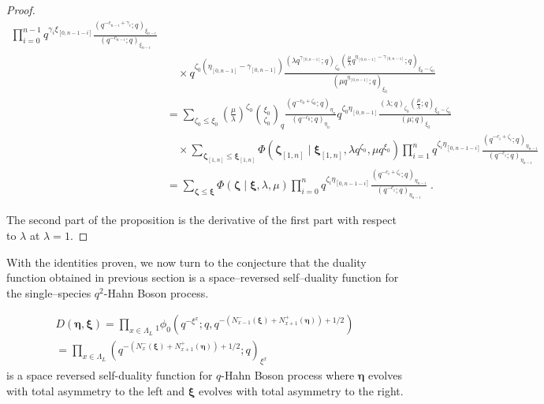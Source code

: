 \documentclass{ximera}
\begin{document}
\begin{proof}
\begin{align*}
        \prod_{i=0}^{n-1}q^{\gamma_i\xi_{[0,n-1-i]}}\frac{\left(q^{-c_{n-i}+\gamma_{i}};q\right)_{\xi_{n-i}}}{\left(q^{-c_{n-i}};q\right)_{\xi_{n-i}}} \\    
        &  \quad  \times q^{\zeta_0(\eta_{[0,n-1]}-\gamma_{[0,n-1]})}\frac{(\lambda q^{\gamma_{[0,n-1]}};q)_{\zeta_0}(\frac{\mu}{\lambda} q^{\eta_{[0,n-1]}-\gamma_{[0,n-1]}};q)_{\xi_{0}-\zeta_0}}{(\mu q^{\eta_{[0,n-1]}};q)_{\xi_{0}}}\\
        &=\sum_{\zeta_0\le \xi_{0}}\left(\frac{\mu}{\lambda}\right)^{\zeta_0}\binom{\xi_{0}}{\zeta_0}_q\frac{\left(q^{-c_{0}+\zeta_0};q\right)_{\eta_n}}{\left(q^{-c_{0}};q\right)_{\eta_n}}q^{\zeta_0\eta_{[0,n-1]}}\frac{(\lambda;q)_{\zeta_0}(\frac{\mu}{\lambda};q)_{\xi_0-\zeta_0}}{(\mu;q)_{\xi_0}}\\
     & \quad \times\sum_{\boldsymbol\zeta_{[1,n]}\le \boldsymbol\xi_{[1,n]}}\Phi(\boldsymbol\zeta_{[1,n]}\mid\boldsymbol\xi_{[1,n]},\lambda q^{\zeta_0},\mu q^{\xi_0})\prod_{i=1}^{n}q^{\zeta_i\eta_{[0,n-1-i]}}\frac{\left(q^{-c_{i}+\zeta_{i}};q\right)_{\eta_{n-i}}}{\left(q^{-c_{i}};q\right)_{\eta_{n-i}}}\\
      &   =\sum_{\boldsymbol\zeta\le \boldsymbol\xi }\Phi(\boldsymbol\zeta\mid\boldsymbol\xi,\lambda,\mu)\prod_{i=0}^{n}q^{\zeta_i\eta_{[0,n-1-i]}}\frac{\left(q^{-c_i+\zeta_i};q\right)_{\eta_{n-i}}}{\left(q^{-c_i};q\right)_{\eta_{n-i}}}\;.
         \end{align*}
  
The second part of the proposition is the derivative of the first part with respect to $\lambda$ at $\lambda=1$.

\end{proof}

With the identities proven, we now turn to the conjecture that the duality function obtained in previous section is a space–reversed self–duality function for the single--species $q^2$-Hahn Boson process. 

\begin{theorem}
\begin{eqnarray}
     D(\boldsymbol\eta,\boldsymbol\xi) = \prod_{x \in \Lambda_L }{}_1\phi_0\left(q^{-\xi^x};q,q^{-\left(N_{x-1}^-(\boldsymbol\xi)+N_{x+1}^+(\boldsymbol\eta)\right)+1/2}\right) \\
     =\prod_{x \in \Lambda_L } \left(q^{-\left(N_{x}^-(\boldsymbol\xi)+N_{x+1}^+(\boldsymbol\eta)\right)+1/2};q\right)_{\xi^x} \ \ \ \ \ \ \ \ \ \ \ \ \ \   \nonumber
\end{eqnarray} 
is a space reversed self-duality function for $q$-Hahn Boson process where $\boldsymbol\eta$ evolves with total asymmetry to the left and $\boldsymbol\xi$ evolves with total asymmetry to the right.
\end{theorem}
\end{document}

